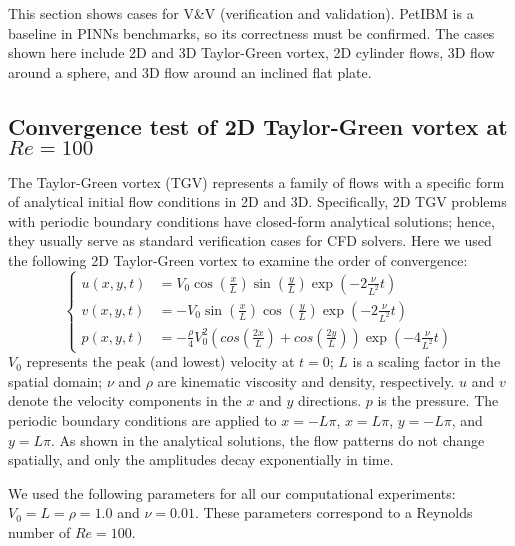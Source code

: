 This section shows cases for V\&V (verification and validation).
PetIBM is a baseline in PINNs benchmarks, so its correctness must be confirmed.
The cases shown here include 2D and 3D Taylor-Green vortex, 2D cylinder flows, 3D flow around a sphere, and 3D flow around an inclined flat plate.

\subsection*{Convergence test of 2D Taylor-Green vortex at $Re=100$}

The Taylor-Green vortex (TGV) represents a family of flows with a specific form of analytical initial flow conditions in 2D and 3D.
Specifically, 2D TGV problems with periodic boundary conditions have closed-form analytical solutions; hence, they usually serve as standard verification cases for CFD solvers. 
Here we used the following 2D Taylor-Green vortex to examine the order of convergence:
\begin{equation}\label{eq:tgv}
    \left\{
        \begin{aligned}
            u(x, y, t) &= V_0\cos(\frac{x}{L})\sin(\frac{y}{L})\exp(-2\frac{\nu}{L^2}t) \\
            v(x, y, t) &= - V_0 \sin(\frac{x}{L})\cos(\frac{y}{L})\exp(-2\frac{\nu}{L^2}t) \\
            p(x, y, t) &= -\frac{\rho}{4}V_0^2\left(cos(\frac{2x}{L}) + cos(\frac{2y}{L})\right)\exp(-4\frac{\nu}{L^2}t)
        \end{aligned}
    \right.
\end{equation}
$V_0$ represents the peak (and lowest) velocity at $t=0$;
$L$ is a scaling factor in the spatial domain;
$\nu$ and $\rho$ are kinematic viscosity and density, respectively.
$u$ and $v$ denote the velocity components in the $x$ and $y$ directions.
$p$ is the pressure.
The periodic boundary conditions are applied to $x=-L\pi$, $x=L\pi$, $y=-L\pi$, and $y=L\pi$.
As shown in the analytical solutions, the flow patterns do not change spatially, and only the amplitudes decay exponentially in time.

We used the following parameters for all our computational experiments: $V_0=L=\rho=1.0$ and $\nu=0.01$.
These parameters correspond to a Reynolds number of $Re=100$.

